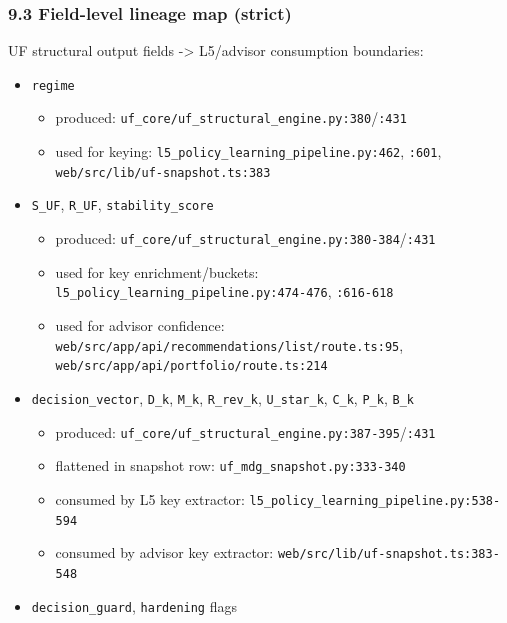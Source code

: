 \documentclass[
]{article}
\providecommand{\tightlist}{%
  \setlength{\itemsep}{0pt}\setlength{\parskip}{0pt}}
\begin{document}
\subsubsection{9.3 Field-level lineage map
(strict)}\label{93-field-level-lineage-map-strict}

UF structural output fields -\textgreater{} L5/advisor consumption
boundaries:

\begin{itemize}
\item
  \texttt{regime}

  \begin{itemize}
  \tightlist
  \item
    produced:
    \texttt{uf\_core/uf\_structural\_engine.py:380}/\texttt{:431}
  \item
    used for keying: \texttt{l5\_policy\_learning\_pipeline.py:462},
    \texttt{:601}, \texttt{web/src/lib/uf-snapshot.ts:383}
  \end{itemize}
\item
  \texttt{S\_UF}, \texttt{R\_UF}, \texttt{stability\_score}

  \begin{itemize}
  \tightlist
  \item
    produced:
    \texttt{uf\_core/uf\_structural\_engine.py:380-384}/\texttt{:431}
  \item
    used for key enrichment/buckets:
    \texttt{l5\_policy\_learning\_pipeline.py:474-476},
    \texttt{:616-618}
  \item
    used for advisor confidence:
    \texttt{web/src/app/api/recommendations/list/route.ts:95},
    \texttt{web/src/app/api/portfolio/route.ts:214}
  \end{itemize}
\item
  \texttt{decision\_vector}, \texttt{D\_k}, \texttt{M\_k},
  \texttt{R\_rev\_k}, \texttt{U\_star\_k}, \texttt{C\_k}, \texttt{P\_k},
  \texttt{B\_k}

  \begin{itemize}
  \tightlist
  \item
    produced:
    \texttt{uf\_core/uf\_structural\_engine.py:387-395}/\texttt{:431}
  \item
    flattened in snapshot row: \texttt{uf\_mdg\_snapshot.py:333-340}
  \item
    consumed by L5 key extractor:
    \texttt{l5\_policy\_learning\_pipeline.py:538-594}
  \item
    consumed by advisor key extractor:
    \texttt{web/src/lib/uf-snapshot.ts:383-548}
  \end{itemize}
\item
  \texttt{decision\_guard}, \texttt{hardening} flags


\end{itemize}
\end{document}

